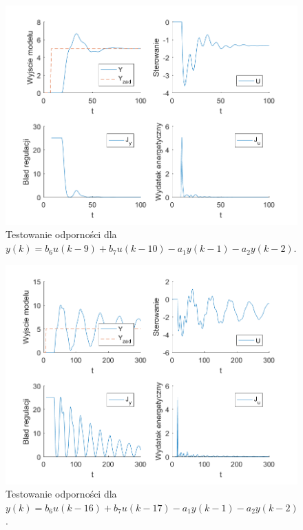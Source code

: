 \documentclass[a4paper, 10pt]{article}
\begin{document}
	\begin{figure}[H]
		\centering
		\includegraphics[width=0.9\linewidth]{z6_-3}
		\caption{Testowanie odporności dla  $y(k) = b_6u(k-9)+b_7u(k-10)-a_1y(k-1)-a_2y(k-2)$.}
		\label{fig:z6_-3}
		\end{figure}
		
	\begin{figure}[H]
			\centering
			\includegraphics[width=0.9\linewidth]{z6_-10}
			\caption{Testowanie odporności dla  $y(k) = b_6u(k-16)+b_7u(k-17)-a_1y(k-1)-a_2y(k-2)$.}
			\label{fig:z6_-10}
			\end{figure}
	
\end{document}
